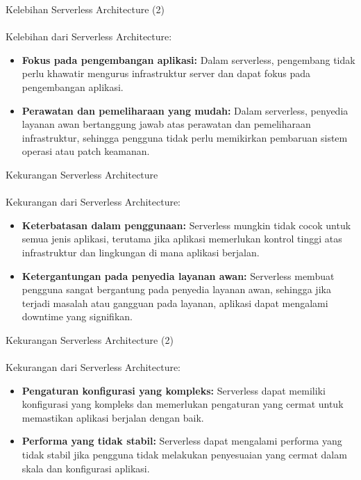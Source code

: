 \documentclass[aspectratio=169, table]{beamer}
\begin{document}
	\begin{frame}{Kelebihan Serverless Architecture (2)}
		\framesubtitle{\hspace{1cm}}
		Kelebihan dari Serverless Architecture:
		\begin{itemize}
			
			\item \textbf{Fokus pada pengembangan aplikasi:} Dalam serverless, pengembang tidak perlu khawatir mengurus infrastruktur server dan dapat fokus pada pengembangan aplikasi.
			\item \textbf{Perawatan dan pemeliharaan yang mudah:} Dalam serverless, penyedia layanan awan bertanggung jawab atas perawatan dan pemeliharaan infrastruktur, sehingga pengguna tidak perlu memikirkan pembaruan sistem operasi atau patch keamanan.
		\end{itemize}
	\end{frame}
	
	\begin{frame}{Kekurangan Serverless Architecture}
		\framesubtitle{\hspace{1cm}}
		Kekurangan dari Serverless Architecture:
		\begin{itemize}
			\item \textbf{Keterbatasan dalam penggunaan:} Serverless mungkin tidak cocok untuk semua jenis aplikasi, terutama jika aplikasi memerlukan kontrol tinggi atas infrastruktur dan lingkungan di mana aplikasi berjalan.
			\item \textbf{Ketergantungan pada penyedia layanan awan:} Serverless membuat pengguna sangat bergantung pada penyedia layanan awan, sehingga jika terjadi masalah atau gangguan pada layanan, aplikasi dapat mengalami downtime yang signifikan.
		
		\end{itemize}
	\end{frame}
	
	\begin{frame}{Kekurangan Serverless Architecture (2)}
			\framesubtitle{\hspace{1cm}}
		Kekurangan dari Serverless Architecture:
		\begin{itemize}
			
			\item \textbf{Pengaturan konfigurasi yang kompleks:} Serverless dapat memiliki konfigurasi yang kompleks dan memerlukan pengaturan yang cermat untuk memastikan aplikasi berjalan dengan baik.
			\item \textbf{Performa yang tidak stabil:} Serverless dapat mengalami performa yang tidak stabil jika pengguna tidak melakukan penyesuaian yang cermat dalam skala dan konfigurasi aplikasi.
		\end{itemize}
	\end{frame}
	
\end{document}
